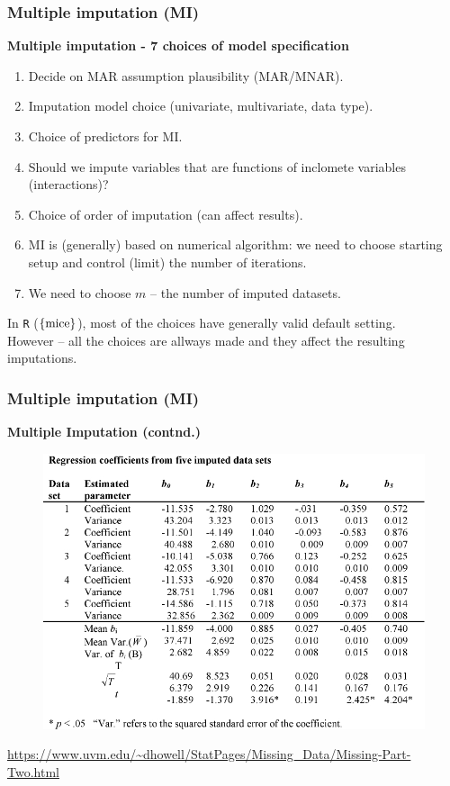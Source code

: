 \documentclass{beamer}
\begin{document}
\begin{frame}
\frametitle{Multiple imputation (MI)}
\textbf{Multiple imputation - 7 choices of model specification}\\
\smallskip
\begin{enumerate}
    \item Decide on MAR assumption plausibility (MAR/MNAR).
    \item Imputation model choice (univariate, multivariate, data type).
    \item Choice of predictors for MI.
    \item Should we impute variables that are functions of inclomete variables (interactions)?
    \item Choice of order of imputation (can affect results).
    \item MI is (generally) based on numerical algorithm: we need to choose starting setup and control (limit) the number of iterations.
    \item We need to choose $m$ -- the number of imputed datasets.
\end{enumerate}
\smallskip
In \texttt{R} ($\{ \textnormal{mice} \}$), most of the choices have generally valid default setting.\\
\smallskip
However -- all the choices are allways made and they affect the resulting imputations.
\end{frame}
\begin{frame}
\frametitle{Multiple imputation (MI)}
\textbf{Multiple Imputation (contnd.) }
\begin{figure}
\includegraphics[width=0.7\linewidth]{IMG/mitable.jpg}
\end{figure}
\scriptsize{\url{https://www.uvm.edu/~dhowell/StatPages/Missing_Data/Missing-Part-Two.html}}
\end{frame}
\end{document}
